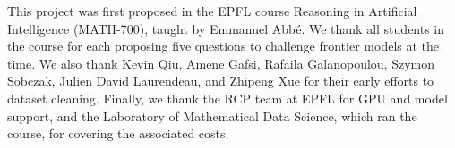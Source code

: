 \begin{ack}
This project was first proposed in the EPFL course Reasoning in Artificial Intelligence (MATH-700), taught by Emmanuel Abbé. We thank all students in the course for each proposing five questions to challenge frontier models at the time. We also thank Kevin Qiu, Amene Gafsi, Rafaila Galanopoulou, Szymon Sobczak, Julien David Laurendeau, and Zhipeng Xue for their early efforts to dataset cleaning. Finally, we thank the RCP team at EPFL for GPU and model support, and the Laboratory of Mathematical Data Science, which ran the course, for covering the associated costs.
\end{ack}